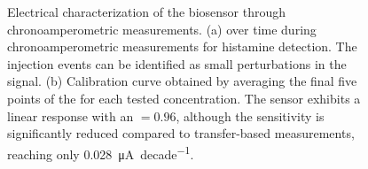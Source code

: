 \begin{figure}[htbp]
    \centering
    \quad
    \caption{Electrical characterization of the biosensor through chronoamperometric measurements.
    (a) \idscorr{} over time during chronoamperometric measurements for histamine detection. The injection events can be identified as small perturbations in the signal. 
    (b) Calibration curve obtained by averaging the final five points of the \idscorr{} for each tested concentration. The sensor exhibits a linear response with an \rsq{}$= 0.96$, although the sensitivity is significantly reduced compared to transfer-based measurements, reaching only \SI{0.028}{\uA \per decade}.
    }
    \label{fig:HisChrono}
\end{figure}


